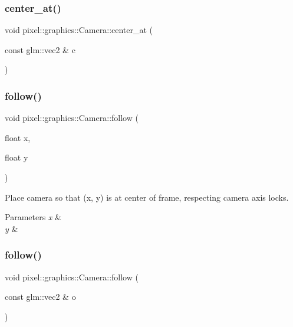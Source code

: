 \subsubsection{\texorpdfstring{center\+\_\+at()}{center\_at()}\hspace{0.1cm}{\footnotesize\ttfamily [2/2]}}
{\footnotesize\ttfamily void pixel\+::graphics\+::\+Camera\+::center\+\_\+at (\begin{DoxyParamCaption}\item[{const glm\+::vec2 \&}]{c }\end{DoxyParamCaption})}

\mbox{\label{classpixel_1_1graphics_1_1_camera_a24e2aa28bbfbfb5c93f9d734e77ee375}} 
\subsubsection{\texorpdfstring{follow()}{follow()}\hspace{0.1cm}{\footnotesize\ttfamily [1/2]}}
{\footnotesize\ttfamily void pixel\+::graphics\+::\+Camera\+::follow (\begin{DoxyParamCaption}\item[{float}]{x,  }\item[{float}]{y }\end{DoxyParamCaption})}



Place camera so that (x, y) is at center of frame, respecting camera axis locks. 


\begin{DoxyParams}{Parameters}
{\em x} & \\
\hline
{\em y} & \\
\hline
\end{DoxyParams}
\mbox{\label{classpixel_1_1graphics_1_1_camera_adf121c3cfbf7e965902a9e5cd8ec3794}} 
\subsubsection{\texorpdfstring{follow()}{follow()}\hspace{0.1cm}{\footnotesize\ttfamily [2/2]}}
{\footnotesize\ttfamily void pixel\+::graphics\+::\+Camera\+::follow (\begin{DoxyParamCaption}\item[{const glm\+::vec2 \&}]{o }\end{DoxyParamCaption})}

